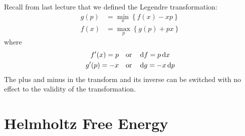 \documentclass[a4paper,twoside,master.tex]{subfiles}
\begin{document}

Recall from last lecture that we defined the Legendre transformation:
\begin{align}\label{eq:legendre_transform}
    g(p) &= \min_x \left\{ f(x) - xp \right\}\tag{Legendre Transformation} \\
    f(x)  &= \max_p \left\{ g(p) + px \right\}\tag{Inverse Legendre Transformation}
\end{align}
where
\begin{gather}
    f'(x) = p \qor \dd{f} = p \dd{x} \\
    g'(p) = -x \qor \dd{g} = -x \dd{p}
\end{gather}
The plus and minus in the transform and its inverse can be switched with no effect to the validity of the transformation.

\section{Helmholtz Free Energy}
\label{sec:helmholtz_free_energy}
\end{document}

